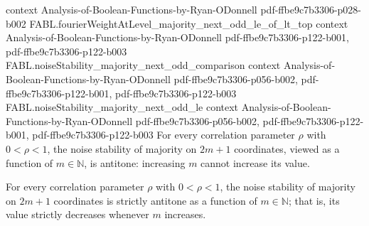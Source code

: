 \begin{theorem}
  {context}
  {Analysis-of-Boolean-Functions-by-Ryan-ODonnell}
  {pdf-ffbe9c7b3306-p028-b002}
\proofstep
  {FABL.fourierWeightAtLevel_majority_next_odd_le_of_lt_top}
  {context}
  {Analysis-of-Boolean-Functions-by-Ryan-ODonnell}
  {pdf-ffbe9c7b3306-p122-b001,
    pdf-ffbe9c7b3306-p122-b003}
\proofstep
  {FABL.noiseStability_majority_next_odd_comparison}
  {context}
  {Analysis-of-Boolean-Functions-by-Ryan-ODonnell}
  {pdf-ffbe9c7b3306-p056-b002,
    pdf-ffbe9c7b3306-p122-b001,
    pdf-ffbe9c7b3306-p122-b003}
\proofstep
  {FABL.noiseStability_majority_next_odd_le}
  {context}
  {Analysis-of-Boolean-Functions-by-Ryan-ODonnell}
  {pdf-ffbe9c7b3306-p056-b002,
    pdf-ffbe9c7b3306-p122-b001,
    pdf-ffbe9c7b3306-p122-b003}
For every correlation parameter $\rho$ with $0<\rho<1$, the noise stability of majority
on $2m+1$ coordinates, viewed as a function of $m\in\mathbb{N}$, is antitone: increasing
$m$ cannot increase its value.
\end{theorem}

\begin{theorem}
\label{FABL.noiseStability_majority_odd_strictAnti}
\leanok
{}
For every correlation parameter $\rho$ with $0<\rho<1$, the noise stability of majority
on $2m+1$ coordinates is strictly antitone as a function of $m\in\mathbb{N}$; that is,
its value strictly decreases whenever $m$ increases.
\end{theorem}

